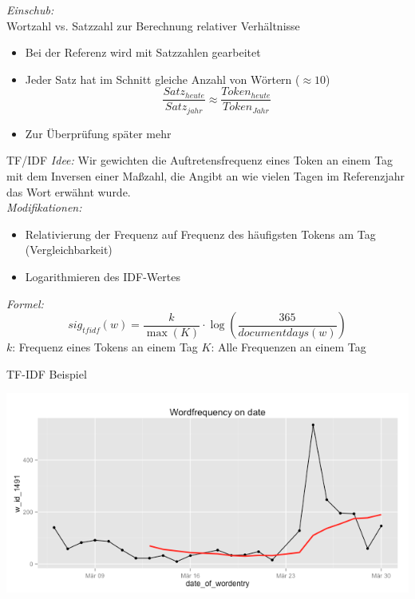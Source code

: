 \documentclass{beamer}
\begin{document}
\begin{frame}{\emph{Einschub: }\\Wortzahl vs. Satzzahl zur Berechnung relativer Verh\"altnisse}
	\begin{itemize}
		\item{Bei der Referenz wird mit Satzzahlen gearbeitet}
		
		\item{Jeder Satz hat im Schnitt gleiche Anzahl von W\"ortern ($\approx 10$)\\
			\begin{equation}
				\frac{Satz_{heute}}{Satz_{jahr}} \approx \frac{Token_{heute}}{Token_{Jahr}}
			\end {equation}
			}
		\item{Zur \"Uberpr\"ufung sp\"ater mehr}
	\end{itemize}
\end{frame}


\begin{frame}{TF/IDF}
 	\emph{Idee: } Wir gewichten die Auftretensfrequenz eines Token an einem Tag mit dem Inversen einer Maßzahl, die Angibt an wie vielen Tagen im Referenzjahr das Wort erw\"ahnt wurde.\\
	\emph{Modifikationen: } 
	\begin{itemize}
		\item{Relativierung der Frequenz auf Frequenz des h\"aufigsten Tokens am Tag (Vergleichbarkeit)}
		\item{Logarithmieren des IDF-Wertes}
	\end{itemize}
	\emph{Formel:}
	 \begin{equation}
		sig_{tf idf}(w) = \frac{k}{\max(K)} \cdot \log ( \frac{365}{documentdays(w)})
	\end{equation}
	$k$: Frequenz eines Tokens an einem Tag
	$K$: Alle Frequenzen an einem Tag
\end{frame}

\begin{frame}{TF-IDF Beispiel}
	\hspace{1cm}
	  \begin{centering}
	  \includegraphics[width=1\textwidth]{pictures/freqratioFlugzeug.png}
	\end{centering}
\end{frame}
\end{document}
